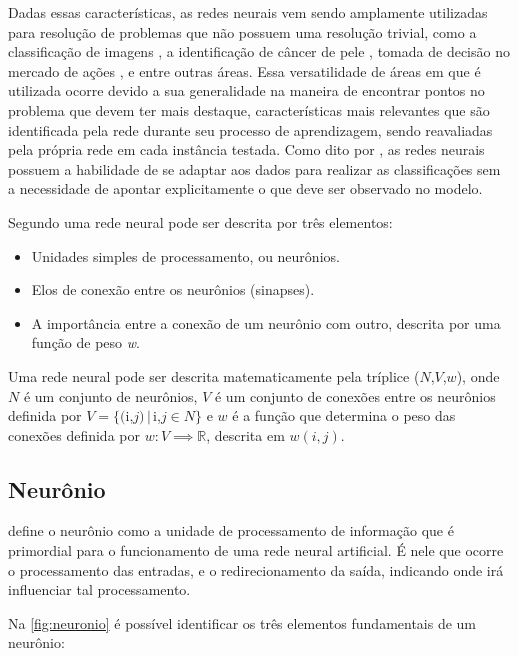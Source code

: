 \par Dadas essas características, as redes neurais vem sendo amplamente utilizadas para resolução de problemas que não possuem uma resolução trivial, como a classificação de imagens \cite{imaginetArticle}, a identificação de câncer de pele \cite{esteva2017dermatologist}, tomada de decisão no mercado de ações \cite{gambogi2013aplicaccao}, e entre outras áreas. Essa versatilidade de áreas em que é utilizada ocorre devido a sua generalidade na maneira de encontrar pontos no problema que devem ter mais destaque, características mais relevantes que são identificada pela rede durante seu processo de aprendizagem, sendo reavaliadas pela própria rede em cada instância testada. Como dito por , as redes neurais possuem a habilidade de se adaptar aos dados para realizar as classificações sem a necessidade de apontar explicitamente o que deve ser observado no modelo.
\par Segundo  uma rede neural pode ser descrita por três elementos:
\begin{itemize}
\item Unidades simples de processamento, ou neurônios.
\item Elos de conexão entre os neurônios (sinapses).
\item A importância entre a conexão de um neurônio com outro, descrita por uma função de peso \textit{w}.
\end{itemize}
\par Uma rede neural pode ser descrita matematicamente pela tríplice ($N$,$V$,$w$), onde $N$ é um conjunto de neurônios, $V$ é um conjunto de conexões entre os neurônios definida por $V = \{($i,$j) \,|\, $i,$j \in N \}$ e $w$ é a função que determina o peso das conexões definida por $w: V \implies \mathbb{R}$, descrita em $w(i,j)$.
\subsection{Neurônio}
 define o neurônio como a unidade de processamento de informação que é primordial para o funcionamento de uma rede neural artificial. É nele que ocorre o processamento das entradas, e o redirecionamento da saída, indicando onde irá influenciar tal processamento.
\par Na \autoref{fig:neuronio} é possível identificar os três elementos fundamentais de um neurônio:

